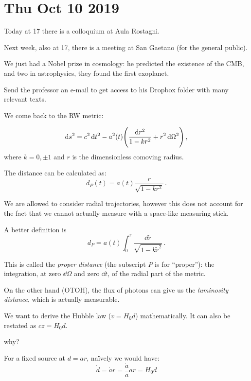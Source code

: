 \documentclass[main.tex]{subfiles}
\begin{document}
\section*{Thu Oct 10 2019}

Today at 17 there is a colloquium at Aula Rostagni.

Next week, also at 17, there is a meeting at San Gaetano (for the general public).

We just had a Nobel prize in cosmology: he predicted the existence of the CMB, and two in astrophysics, they found the first exoplanet.

Send the professor an e-mail to get access to his Dropbox folder with many relevant texts.

We come back to the RW metric:

\begin{equation}
  \dd{s^2} = c^{2} \dd{t^{2}} - a^2(t) \qty(\frac{\dd{r^2}}{1-kr^2} + r^2 \dd{\Omega^2})\,,
\end{equation}
%
where \(k=0, \pm 1\) and \(r\) is the dimensionless comoving radius.

The distance can be calculated as:
%
\begin{equation}
  d_P (t) = a(t)\frac{r}{\sqrt{1-kr^2}}\,.
\end{equation}

We are allowed to consider radial trajectories, however this does not account for the fact that we cannot actually measure with a space-like measuring stick.

A better definition is
%
\begin{equation}
  d_P = a(t) \int_0^r \frac{\dd{\widetilde{r}}}{\sqrt{1-k \widetilde{r}^2}}\,.
\end{equation}

This is called the \emph{proper distance} (the subscript \(P\) is for ``proper''): the integration, at zero \(\dd{\Omega}\) and zero \(\dd{t}\), of the radial part of the metric.

On the other hand (OTOH), the flux of photons can give us the \emph{luminosity distance}, which is actually measurable.

We want to derive the Hubble law (\(v = H_0 d\)) mathematically. It can also be restated as \(cz = H_0 d\). 

\begin{greenbox}
  why?
\end{greenbox}

For a fixed source at \(d = ar\), naïvely we would have:
%
\begin{equation}
  \dot{d} = \dot{a} r = \frac{\dot{a} }{a} ar = H_0  d
\end{equation}
\end{document}
